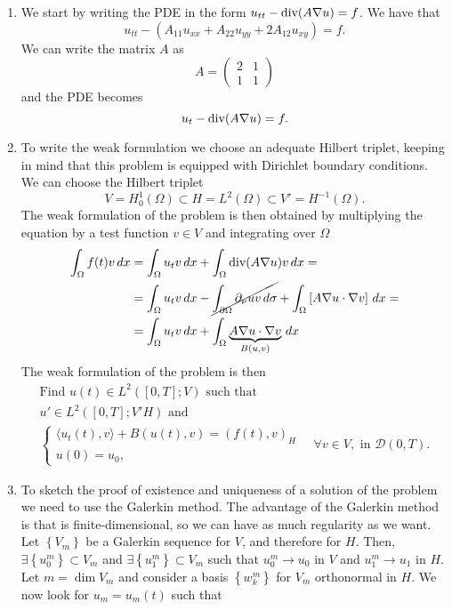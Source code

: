 \begin{enumerate}
    \item We start by writing the PDE in the form \(u_{tt} - \text{div}(A \nabla u) = f\). We have that
    \[
        u_{tt} - \left(A_{11} u_{xx} + A_{22} u_{yy} + 2A_{12} u_{xy}\right) = f.
    \]
    We can write the matrix \(A\) as
    \[
        A = \begin{pmatrix}
            2 & 1 \\
            1 & 1
        \end{pmatrix}
    \]
    and the PDE becomes
    \[
        u_{t} - \text{div} (A \nabla u) = f.
    \]
    \item To write the weak formulation we choose an adequate Hilbert triplet, keeping in mind that this problem is equipped with Dirichlet boundary conditions. We can choose the Hilbert triplet
    \[
        V = H^1_0(\Omega) \subset H = L^2(\Omega) \subset V' = H^{-1}(\Omega).
    \]
    The weak formulation of the problem is then obtained by multiplying the equation by a test function \(v \in V\) and integrating over \(\Omega\)
    \begin{align*}
        \int_\Omega f(t) v \, dx &= \int_\Omega u_{t} v \, dx + \int_\Omega \text{div}(A \nabla u)v \, dx =\\
        &= \int_\Omega u_{t} v \, dx - \cancel{\int_{\partial\Omega} \partial_\nu u v \, d\sigma} + \int_\Omega \left[A \nabla u \cdot \nabla v\right] \, dx = \\
        &= \int_\Omega u_{t} v \, dx + \int_\Omega \underbrace{A \nabla u \cdot \nabla v}_{B(u, v)} \, dx
    \end{align*}
    The weak formulation of the problem is then
    \[
        \begin{split}
            \text{Find } u(t) \in L^2([0, T]; V) \text{ such that } \\
            u' \in L^2([0, T];V'H)\text{ and } \\
            \begin{cases}
                \langle u_{t}(t), v \rangle + B(u(t), v) = (f(t), v)_H \\
                u(0) = u_0,
            \end{cases}\quad \forall v \in V, \text{ in } \mathcal{D}(0, T).
        \end{split}
    \]
    \item To sketch the proof of existence and uniqueness of a solution of the problem we need to use the Galerkin method. The advantage of the Galerkin method is that is finite-dimensional, so we can have as much regularity as we want. Let \(\left\{V_m\right\}\) be a Galerkin sequence for \(V\), and therefore for \(H\). Then, \(\exists \left\{u_0^m\right\} \subset V_m\) and \(\exists \left\{u_1^m\right\} \subset V_m\) such that \(u_0^m \to u_0\) in \(V\) and \(u_1^m \to u_1\) in \(H\). Let \(m = \dim V_m\) and consider a basis \(\left\{w_k^m\right\}\) for \(V_m\) orthonormal in \(H\). We now look for \(u_m = u_m(t)\) such that

\end{enumerate}
